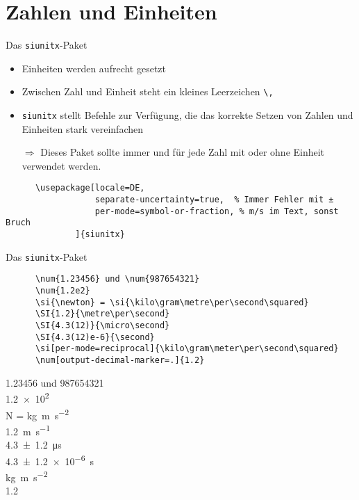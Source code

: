 \section{Zahlen und Einheiten}

\begin{frame}[fragile]{
  Das \texttt{siunitx}-Paket
  \hfill{}
}
\begin{itemize}
    \item Einheiten werden aufrecht gesetzt
    \item Zwischen Zahl und Einheit steht ein kleines Leerzeichen \verb+\,+
    \item \texttt{siunitx} stellt Befehle zur Verfügung, die das korrekte Setzen von Zahlen und Einheiten stark vereinfachen
    \item[$\Rightarrow$] Dieses Paket sollte immer und für jede Zahl mit oder ohne Einheit verwendet werden.
\end{itemize}
  \begin{Packages}
    \begin{lstlisting}
      \usepackage[locale=DE,
                  separate-uncertainty=true,  % Immer Fehler mit ±
                  per-mode=symbol-or-fraction, % m/s im Text, sonst Bruch
              ]{siunitx}
    \end{lstlisting}
  \end{Packages}
\end{frame}

\begin{frame}[fragile]{Das \texttt{siunitx}-Paket}
  \begin{CodeExample}{0.60}
    \begin{lstlisting}
      \num{1.23456} und \num{987654321}
      \num{1.2e2}
      \si{\newton} = \si{\kilo\gram\metre\per\second\squared}
      \SI{1.2}{\metre\per\second}
      \SI{4.3(12)}{\micro\second}
      \SI{4.3(12)e-6}{\second}
      \si[per-mode=reciprocal]{\kilo\gram\meter\per\second\squared}
      \num[output-decimal-marker=.]{1.2}
    \end{lstlisting}
  \CodeResult
    \num{1.23456} und \num{987654321} \\
    \num{1.2e2} \\
    \smallbreak
    \si{\newton} = \si{\kilo\gram\metre\per\second\squared} \\
    \medbreak
    \SI{1.2}{\metre\per\second} \\
    \SI{4.3(12)}{\micro\second} \\
    \SI{4.3(12)e-6}{\second} \\
    \si[per-mode=reciprocal]{\kilo\gram\meter\per\second\squared} \\[\baselineskip]
    \num[output-decimal-marker=.]{1.2}
  \end{CodeExample}
\end{frame}
